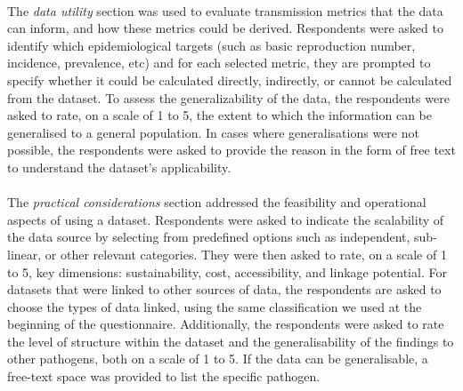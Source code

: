 \documentclass{article}
\begin{document}
\paragraph{} The \textit{data utility} section was used to evaluate transmission metrics that the data can inform, and how these metrics could be derived. Respondents were asked to identify which epidemiological targets (such as basic reproduction number, incidence, prevalence, etc) and for each selected metric, they are prompted to specify whether it could be calculated directly, indirectly, or cannot be calculated from the dataset. To assess the generalizability of the data, the respondents were asked to rate, on a scale of 1 to 5, the extent to which the information can be generalised to a general population. In cases where generalisations were not possible, the respondents were asked to provide the reason in the form of free text to understand the dataset's applicability. 

\paragraph{}The \textit{practical considerations} section addressed the feasibility and operational aspects of using a dataset. Respondents were asked to indicate the scalability of the data source by selecting from predefined options such as independent, sub-linear, or other relevant categories. They were then asked to rate, on a scale of 1 to 5, key dimensions: sustainability, cost, accessibility, and linkage potential. For datasets that were linked to other sources of data, the respondents are asked to choose the types of data linked, using the same classification we used at the beginning of the questionnaire.  Additionally, the respondents were asked to rate the level of structure within the dataset and the generalisability of the findings to other pathogens, both on a scale of 1 to 5. If the data can be generalisable, a free-text space was provided to list the specific pathogen. 
\end{document}
